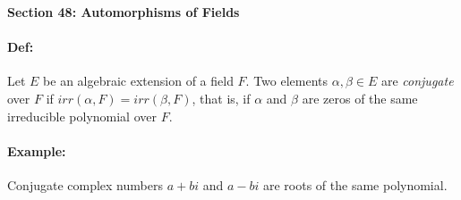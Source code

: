 \documentclass[10pt,a4paper]{article}
\begin{document}
\begin{center}
\textbf{Section 48: Automorphisms of Fields}
\end{center}

\paragraph{Def:} Let $E$ be an algebraic extension of a field $F$. Two elements $\alpha,\beta \in E$ are \textit{conjugate} over $F$ if $irr(\alpha, F) = irr(\beta, F)$, that is, if $\alpha$ and $\beta$ are zeros of the same irreducible polynomial over $F$.

\paragraph{Example:} Conjugate complex numbers $a+bi$ and $a-bi$ are roots of the same polynomial.
\end{document}
